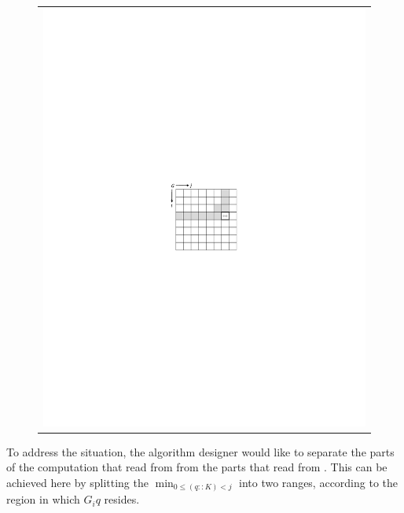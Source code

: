 \begin{figure}
\begin{tabular}{l}\includegraphics{img/gap-depend}\end{tabular}
\caption{\label{intro:gap dependency matrix}}
\end{figure}

To address the situation, the algorithm designer would like to separate the parts
of the computation that read from  from the parts that read from .
This can be achieved here by splitting the $\min_{0\leq(q::K)<j}$ into two
ranges, according to the region in which $G_iq$ resides.

